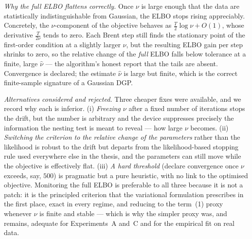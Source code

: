 \documentclass[11pt, a4paper, oneside]{article}
\begin{document}
\emph{Why the full ELBO flattens correctly.} Once $\nu$ is large
enough that the data are statistically indistinguishable from
Gaussian, the ELBO stops rising appreciably. Concretely, the
$\nu$-component of the objective behaves as $\tfrac{T}{2}\log\nu +
O(1)$, whose derivative $\tfrac{T}{2\nu}$ tends to zero. Each Brent
step still finds the stationary point of the first-order condition at
a slightly larger $\nu$, but the resulting ELBO gain per step shrinks
to zero, so the relative change of the \emph{full} ELBO falls below
tolerance at a finite, large $\hat{\nu}$ --- the algorithm's honest
report that the tails are absent. Convergence is declared; the
estimate $\hat{\nu}$ is large but finite, which is the correct
finite-sample signature of a Gaussian DGP.

\emph{Alternatives considered and rejected.} Three cheaper fixes were
available, and we record why each is inferior. (i) \emph{Freezing
$\nu$} after a fixed number of iterations stops the drift, but the
number is arbitrary and the device suppresses precisely the
information the nesting test is meant to reveal --- how large $\nu$
becomes. (ii) \emph{Switching the criterion to the relative change of
the parameters} rather than the likelihood is robust to the drift but
departs from the likelihood-based stopping rule used everywhere else
in the thesis, and the parameters can still move while the objective
is effectively flat. (iii) \emph{A hard threshold} (declare
convergence once $\nu$ exceeds, say, $500$) is pragmatic but a pure
heuristic, with no link to the optimised objective. Monitoring the
full ELBO is preferable to all three because it is not a patch: it is
the principled criterion that the variational formulation prescribes
in the first place, exact in every regime, and reducing to the
term~(1) proxy whenever $\nu$ is finite and stable --- which is why
the simpler proxy was, and remains, adequate for Experiments~A and~C
and for the empirical fit on real data.
\end{document}
